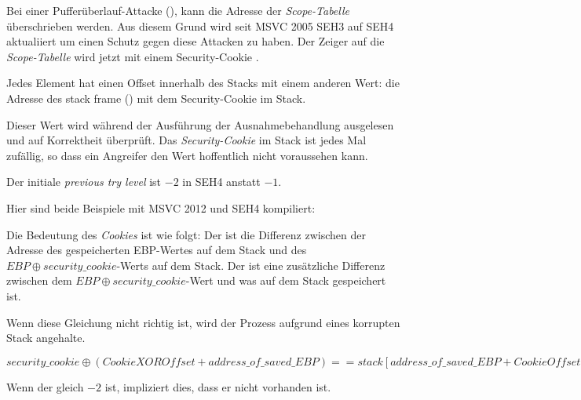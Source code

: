 
\myindex{\BufferOverflow}
Bei einer Pufferüberlauf-Attacke (), kann die Adresse der \emph{Scope-Tabelle}
überschrieben werden. Aus diesem Grund wird seit MSVC 2005 SEH3 auf SEH4 aktualiiert um einen Schutz gegen
diese Attacken zu haben.
Der Zeiger auf die \emph{Scope-Tabelle} wird jetzt mit einem Security-Cookie .

Jedes Element hat einen Offset innerhalb des Stacks mit einem anderen Wert:
die Adresse des \gls{stack frame} (\EBP)  mit dem Security-Cookie im Stack.

Dieser Wert wird während der Ausführung der Ausnahmebehandlung ausgelesen und auf
Korrektheit überprüft.
Das \emph{Security-Cookie} im Stack ist jedes Mal zufällig, so dass ein Angreifer den
Wert hoffentlich nicht voraussehen kann.

Der initiale \emph{previous try level} ist $-2$ in SEH4 anstatt $-1$.

\def\SEHfour{1}


Hier sind beide Beispiele mit MSVC 2012 und SEH4 kompiliert:





Die Bedeutung des \emph{Cookies} ist wie folgt:
Der  ist die Differenz zwischen der Adresse des gespeicherten EBP-Wertes
auf dem Stack und des $EBP \oplus security\_cookie$-Werts auf dem Stack.
Der   ist eine zusätzliche Differenz zwischen dem $EBP \oplus security\_cookie$-Wert
und was auf dem Stack gespeichert ist.

Wenn diese Gleichung nicht richtig ist, wird der Prozess aufgrund eines korrupten Stack angehalte.

\begin{center}
$security\_cookie \oplus (CookieXOROffset + address\_of\_saved\_EBP) == stack[address\_of\_saved\_EBP + CookieOffset]$
\end{center}

Wenn der  gleich $-2$ ist, impliziert dies, dass er nicht vorhanden ist.

\iffalse
\myindex{tracer}
\emph{Cookie}-Überprüfung ist auch in dem \tracer{} implementiert.
Siehe \href{http://go.yurichev.com/17061}{GitHub} für Details.

Es ist immer noch möglich, SEH3 im Compiler zu nutzen wenn eine neuere Version als MSVC 2005
genutzt wird, durch setzen der \TT{/GS-}-Option.
Der \ac{CRT}-Code nutzt SEH4 auf jeden Fall.
\fi

